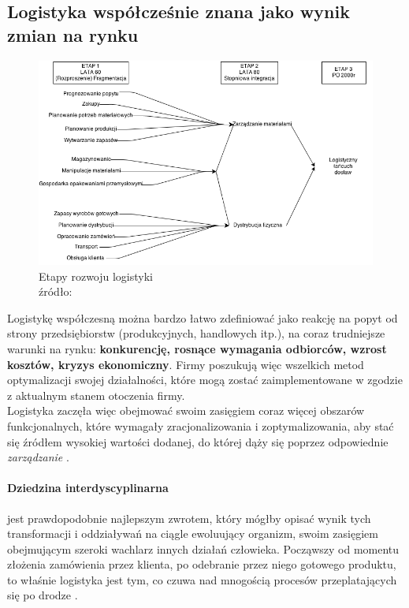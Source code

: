 	\subsection{Logistyka współcześnie znana jako wynik zmian na rynku}
		\begin{figure}[h]
			\centering
			\includegraphics[width=\textwidth]{images/etapy_rozwoju_logistyki}
			\caption[Etapy rozwoju logistyki]{
				Etapy rozwoju logistyki \\
				źródło: \cite{logityka_w_przedsiebiorstwie_sarsjusz_wolski_skowronek}
			}
		\end{figure}
		Logistykę współczesną można bardzo łatwo zdefiniować jako reakcję na popyt od
		strony przedsiębiorstw (produkcyjnych, handlowych itp.), na coraz trudniejsze warunki na
		rynku: \textbf{konkurencję, rosnące wymagania odbiorców, wzrost kosztów, kryzys ekonomi\-czny}.
		Firmy poszukują więc wszelkich metod optymalizacji swojej działalności, 
		które mogą zostać zaimplementowane w zgodzie z aktualnym stanem otoczenia firmy.\\
		
		Logistyka zaczęła więc obejmować swoim zasięgiem coraz więcej obszarów funkcjonalnych, które
		wymagały zracjonalizowania i zoptymalizowania, aby stać się źródłem wysokiej wartości dodanej, do której
		dąży się poprzez odpowiednie \emph{zarządzanie} \cite{logistyka_jako_dziedzina_wiedzy_cz1}.		
		
		\paragraph{Dziedzina interdyscyplinarna} jest prawdopodobnie najlepszym zwrotem, 
		który mógłby opisać wynik tych transformacji i oddziaływań na ciągle ewoluujący organizm, swoim
		zasięgiem obejmującym szeroki wachlarz innych działań człowieka. Począwszy od momentu złożenia
		zamówienia przez klienta, po odebranie przez niego gotowego produktu, to właśnie logistyka jest
		tym, co czuwa nad mnogością procesów przeplatających się po drodze \cite{logistyka_jako_dziedzina_wiedzy_cz2}.	
		
